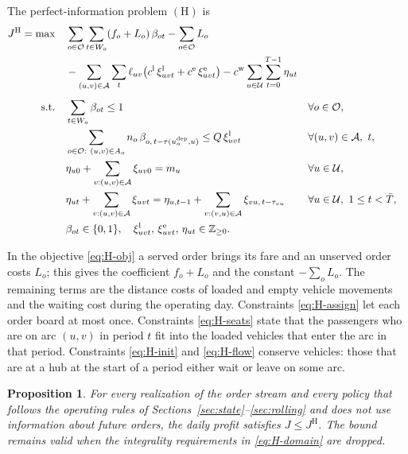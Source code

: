 \documentclass[12pt]{article}
\theoremstyle{plain}
\newtheorem{proposition}{Proposition}
\theoremstyle{definition}
\newcommand{\dep}{u^{\mathrm{dep}}}
\begin{document}
The perfect-information problem $(\mathrm{H})$ is
\begin{align}
J^{\mathrm{H}}=\max\quad
& \sum_{o\in\mathcal{O}}\sum_{t\in W_o}(f_o+L_o)\,\beta_{ot}-\sum_{o\in\mathcal{O}}L_o \notag\\
& -\sum_{(u,v)\in\mathcal{A}}\sum_{t}\ell_{uv}\bigl(c^{\mathrm{l}}\,\xi^{\mathrm{l}}_{uvt}+c^{\mathrm{e}}\,\xi^{\mathrm{e}}_{uvt}\bigr)
 -c^{\mathrm{w}}\sum_{u\in\mathcal{U}}\sum_{t=0}^{T-1}\eta_{ut} \label{eq:H-obj}\\[4pt]
\text{s.t.}\quad
& \sum_{t\in W_o}\beta_{ot}\le 1 && \forall o\in\mathcal{O}, \label{eq:H-assign}\\
& \sum_{o\in\mathcal{O}:\ (u,v)\in A_o} n_o\,\beta_{o,\,t-\tau(\dep_o,u)}\le Q\,\xi^{\mathrm{l}}_{uvt} && \forall (u,v)\in\mathcal{A},\ t, \label{eq:H-seats}\\
& \eta_{u0}+\sum_{v:(u,v)\in\mathcal{A}}\xi_{uv0}=m_u && \forall u\in\mathcal{U}, \label{eq:H-init}\\
& \eta_{ut}+\sum_{v:(u,v)\in\mathcal{A}}\xi_{uvt}
  =\eta_{u,t-1}+\sum_{v:(v,u)\in\mathcal{A}}\xi_{vu,\,t-\tau_{vu}} && \forall u\in\mathcal{U},\ 1\le t<\bar T, \label{eq:H-flow}\\
& \beta_{ot}\in\{0,1\},\quad \xi^{\mathrm{l}}_{uvt},\,\xi^{\mathrm{e}}_{uvt},\,\eta_{ut}\in\mathbb{Z}_{\ge 0}. \label{eq:H-domain}
\end{align}

In the objective \eqref{eq:H-obj} a served order brings its fare and an unserved order costs $L_o$; this gives the coefficient $f_o+L_o$ and the constant $-\sum_o L_o$. The remaining terms are the distance costs of loaded and empty vehicle movements and the waiting cost during the operating day. Constraints \eqref{eq:H-assign} let each order board at most once. Constraints \eqref{eq:H-seats} state that the passengers who are on arc $(u,v)$ in period $t$ fit into the loaded vehicles that enter the arc in that period. Constraints \eqref{eq:H-init} and \eqref{eq:H-flow} conserve vehicles: those that are at a hub at the start of a period either wait or leave on some arc.

\begin{proposition}\label{prop:hindsight}
For every realization of the order stream and every policy that follows the operating rules of Sections~\ref{sec:state}--\ref{sec:rolling} and does not use information about future orders, the daily profit satisfies $J\le J^{\mathrm{H}}$. The bound remains valid when the integrality requirements in \eqref{eq:H-domain} are dropped.
\end{proposition}
\end{document}
